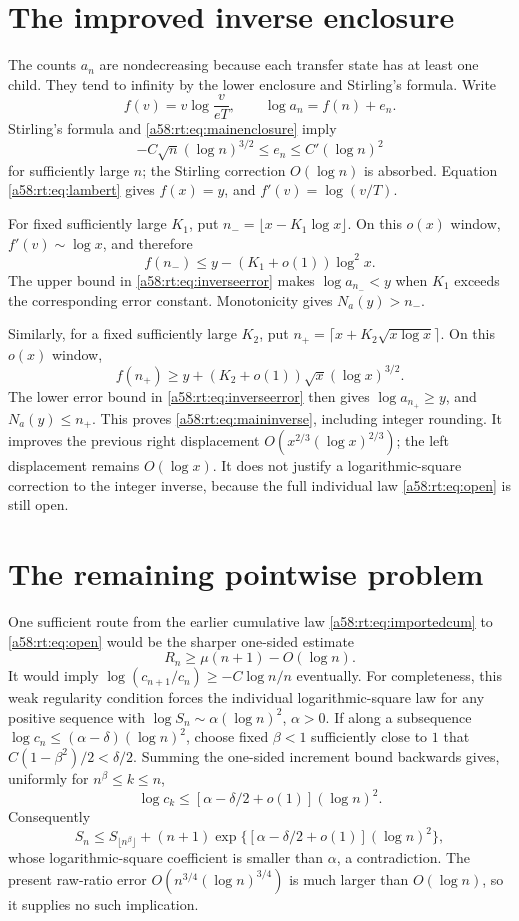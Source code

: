 \documentclass[11pt,letterpaper]{article}
\theoremstyle{remark}
\begin{document}
\section{The improved inverse enclosure}\label{a58:rt:sec:inverse}
The counts $a_n$ are nondecreasing because each transfer state has at
least one child. They tend to infinity by the lower enclosure and
Stirling's formula. Write
\[
 f(v)=v\log\frac{v}{eT},\qquad
 \log a_n=f(n)+e_n.
\]
Stirling's formula and \eqref{a58:rt:eq:mainenclosure} imply
\begin{equation}\label{a58:rt:eq:inverseerror}
 -C\sqrt n(\log n)^{3/2}\le e_n\le C'(\log n)^2
\end{equation}
for sufficiently large $n$; the Stirling correction $O(\log n)$ is
absorbed. Equation \eqref{a58:rt:eq:lambert} gives $f(x)=y$, and
$f'(v)=\log(v/T)$.

For fixed sufficiently large $K_1$, put
$n_- =\lfloor x-K_1\log x\rfloor$. On this $o(x)$ window,
$f'(v)\sim\log x$, and therefore
\[
 f(n_-)\le y-(K_1+o(1))\log^2x.
\]
The upper bound in \eqref{a58:rt:eq:inverseerror} makes $\log a_{n_-}<y$
when $K_1$ exceeds the corresponding error constant. Monotonicity gives
$N_a(y)>n_-$.

Similarly, for a fixed sufficiently large $K_2$, put
$n_+=\lceil x+K_2\sqrt{x\log x}\rceil$. On this $o(x)$ window,
\[
 f(n_+)\ge y+(K_2+o(1))\sqrt x(\log x)^{3/2}.
\]
The lower error bound in \eqref{a58:rt:eq:inverseerror} then gives
$\log a_{n_+}\ge y$, and $N_a(y)\le n_+$. This proves
\eqref{a58:rt:eq:maininverse}, including integer rounding.
It improves the previous right displacement
$O(x^{2/3}(\log x)^{2/3})$; the left displacement remains $O(\log x)$.
It does not justify a logarithmic-square correction to the integer
inverse, because the full individual law \eqref{a58:rt:eq:open} is still open.

\section{The remaining pointwise problem}\label{a58:rt:sec:open}
One sufficient route from the earlier cumulative law
\eqref{a58:rt:eq:importedcum} to \eqref{a58:rt:eq:open} would be the sharper one-sided
estimate
\begin{equation}\label{a58:rt:eq:desiredratio}
 R_n\ge\mu(n+1)-O(\log n).
\end{equation}
It would imply
$\log(c_{n+1}/c_n)\ge-C\log n/n$ eventually.
For completeness, this weak regularity condition forces the individual
logarithmic-square law for any positive sequence with
$\log S_n\sim\alpha(\log n)^2$, $\alpha>0$.
If along a subsequence
$\log c_n\le(\alpha-\delta)(\log n)^2$, choose fixed $\beta<1$
sufficiently close to $1$ that $C(1-\beta^2)/2<\delta/2$.
Summing the one-sided increment bound backwards gives, uniformly for
$n^\beta\le k\le n$,
\[
 \log c_k\le[\alpha-\delta/2+o(1)](\log n)^2.
\]
Consequently
\[
 S_n\le S_{\lfloor n^\beta\rfloor}
 +(n+1)\exp\{[\alpha-\delta/2+o(1)](\log n)^2\},
\]
whose logarithmic-square coefficient is smaller than $\alpha$, a
contradiction. The present raw-ratio error
$O(n^{3/4}(\log n)^{3/4})$ is much larger than $O(\log n)$,
so it supplies no such implication.
\end{document}
